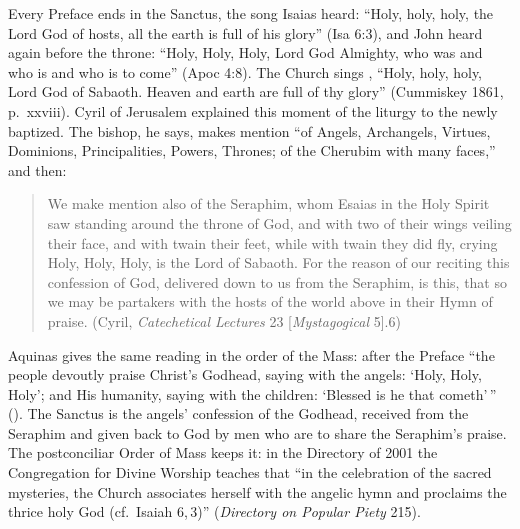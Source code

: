 Every Preface ends in the Sanctus, the song Isaias heard: ``Holy, holy,
holy, the Lord God of hosts, all the earth is full of his glory'' (Isa
6:3), and John heard again before the throne: ``Holy, Holy, Holy, Lord God
Almighty, who was and who is and who is to come'' (Apoc 4:8). The Church
sings , ``Holy, holy, holy, Lord God of Sabaoth.
Heaven and earth are full of thy glory'' (Cummiskey 1861, p.~xxviii).
Cyril of Jerusalem explained this moment of the liturgy to the newly
baptized. The bishop, he says, makes mention ``of Angels, Archangels,
Virtues, Dominions, Principalities, Powers, Thrones; of the Cherubim with
many faces,'' and then:
\begin{quote}
We make mention also of the Seraphim, whom Esaias in the Holy Spirit saw
standing around the throne of God, and with two of their wings veiling
their face, and with twain their feet, while with twain they did fly,
crying Holy, Holy, Holy, is the Lord of Sabaoth. For the reason of our
reciting this confession of God, delivered down to us from the Seraphim,
is this, that so we may be partakers with the hosts of the world above in
their Hymn of praise. (Cyril, \emph{Catechetical Lectures} 23
[\emph{Mystagogical} 5].6)
\end{quote}
Aquinas gives the same reading in the order of the Mass: after the
Preface ``the people devoutly praise Christ's Godhead, saying with the
angels: `Holy, Holy, Holy'; and His humanity, saying with the children:
`Blessed is he that cometh'\,'' (). The Sanctus
is the angels' confession of the Godhead, received from the Seraphim and
given back to God by men who are to share the Seraphim's praise. The
postconciliar Order of Mass keeps it: in the Directory of 2001 the
Congregation for Divine Worship teaches that ``in the celebration of the
sacred mysteries, the Church associates herself with the angelic hymn and
proclaims the thrice holy God (cf.\ Isaiah 6,\,3)'' (\emph{Directory on
Popular Piety} 215).

